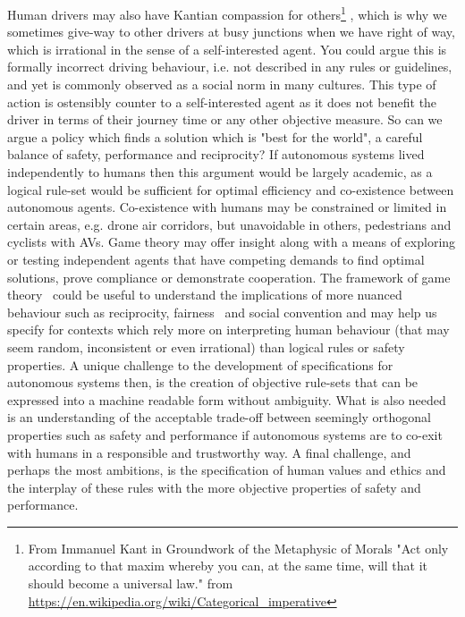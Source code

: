 \documentclass[sigconf]{acmart}
\begin{document}
Human drivers may also have Kantian compassion for others\footnote{From Immanuel Kant in Groundwork of the Metaphysic of Morals "Act only according to that maxim whereby you can, at the same time, will that it should become a universal law." from \url{https://en.wikipedia.org/wiki/Categorical_imperative}} 
, which is why we sometimes give-way to other drivers at busy junctions when we have right of way, which is irrational in the sense of a self-interested agent.
%
You could argue this is formally incorrect driving behaviour, i.e. not described in any rules or guidelines, and yet is commonly observed as a social norm in many cultures. This type of action is ostensibly counter to a self-interested agent as it does not benefit the driver in terms of their journey time or any other objective measure. 
%
So can we argue a policy which finds a solution which is "best for the world", a careful balance of safety, performance and reciprocity? 
%
If autonomous systems lived independently to humans then this argument would be largely academic, as a logical rule-set would be sufficient for optimal efficiency and co-existence between autonomous agents. 
%
Co-existence with humans may be constrained or limited in certain areas, e.g. drone air corridors, but unavoidable in others, pedestrians and cyclists with AVs.
%
Game theory may offer insight along with a means of exploring or testing independent agents that have competing demands to find optimal solutions, prove compliance or demonstrate cooperation. 
%
% 
The framework of game theory~\cite{schecter2016game} could be useful to understand the implications of more nuanced behaviour such as reciprocity, fairness~\cite{gintis2006foundations} and social convention and may help us specify for contexts which rely more on interpreting human behaviour (that may seem random, inconsistent or even irrational) than logical rules or safety properties. 
%
A unique challenge to the development of specifications for autonomous systems then, is the creation of objective rule-sets that can be expressed into a machine readable form without ambiguity. What is also needed is an understanding of the acceptable trade-off between seemingly orthogonal properties such as safety and performance if autonomous systems are to co-exit with humans in a responsible and trustworthy way. 
%
A final challenge, and perhaps the most ambitions, is the specification of human values and ethics and the interplay of these rules with the more objective properties of safety and performance.
\end{document}
